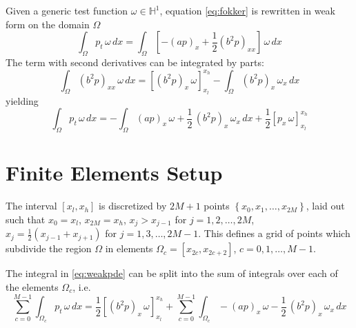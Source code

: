 \documentclass[10pt]{article}
\begin{document}
Given a generic test function $\omega \in \mathbb{H}^1$, equation \eqref{eq:fokker} is rewritten in weak form on the domain $\Omega$
\begin{equation*}
\int_{\Omega} p_t\, \omega\, dx = \int_{\Omega}\left[-(ap)_x+\frac{1}{2}
                  	  (b^2p)_{xx}
             \right] \, \omega\, dx
\end{equation*}
The term with second derivatives can be integrated by parts:
\begin{equation*}
   \int_{\Omega}  (b^2p)_{xx}\, \omega\, dx = [ (b^2p)_x \, \omega ]_{x_{l}}^{x_{h}}
	- \int_{\Omega}  (b^2p)_x \, \omega_{x}\, dx
\end{equation*}
yielding
\begin{equation}
\label{eq:weakpde}
\int_{\Omega} p_t\, \omega\, dx = 
-\int_{\Omega} (ap)_x \, \omega + \frac{1}{2} \, (b^2p)_x \, \omega_{x}\,dx 
               +\frac{1}{2} [ p_x \, \omega ]_{x_l}^{x_h}
\end{equation}

\section{Finite Elements Setup}
\label{sec:fokkersolution}

The interval $[x_l,x_h]$ is discretized by $2M+1$ points $\left\{x_0,x_1, \dots,x_{2M}\right\}$, laid out such that $x_0=x_l$, $x_{2M}=x_h$, $x_j>x_{j-1}$ for $j=1,2,\dots, 2M$, $x_j=\frac{1}{2}(x_{j-1}+x_{j+1})$ for $j=1,3,\dots, 2M-1$. This defines a grid of points which subdivide the region $\Omega$ in elements $\Omega_{c}=[x_{2c},x_{2c+2}]$, $c=0,1,\dots,M-1$. 

\noindent The integral in \eqref{eq:weakpde} can be split into the sum of integrals over each of the elements $\Omega_c$, i.e.
\begin{equation}
\label{eq:weakpde2}
\sum_{c=0}^{M-1}\int_{\Omega_c} p_t\, \omega\, dx =
\frac{1}{2} [ (b^2p)_x \, \omega ]_{x_l}^{x_h}
+\sum_{c=0}^{M-1}\int_{\Omega_c} -(ap)_x\,\omega -\frac{1 }{2} \, (b^2p)_x \,\omega_{x}\,dx 
\end{equation}
\end{document}
